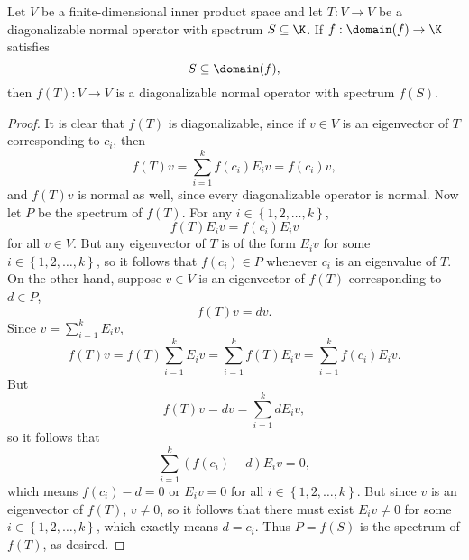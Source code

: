 \documentclass[linearalgebra]{subfiles}
\begin{document}
    \begin{prop}{}
        Let $V$ be a finite-dimensional inner product space and let $T:V\to V$ be a diagonalizable normal operator with spectrum $S\subseteq\K$. If $f:\domain(f)\to\K$ satisfies
        \begin{equation*}
            S\subseteq \domain(f),
        \end{equation*}
        then $f(T):V\to V$ is a diagonalizable normal operator with spectrum $f(S)$. 
    \end{prop}

    \begin{proof}
        It is clear that $f(T)$ is diagonalizable, since if $v\in V$ is an eigenvector of $T$ corresponding to $c_i$, then
        \begin{equation*}
            f(T)v = \sum^{k}_{i=1} f\left( c_i \right) E_iv = f\left( c_i \right) v,
        \end{equation*}
        and $f(T)v$ is normal as well, since every diagonalizable operator is normal. Now let $P$ be the spectrum of $f(T)$. For any $i\in\left\lbrace 1,2,\ldots,k \right\rbrace$, 
        \begin{equation*}
            f(T)E_iv = f\left( c_i \right) E_iv
        \end{equation*}
        for all $v\in V$. But any eigenvector of $T$ is of the form $E_iv$ for some $i\in\left\lbrace 1,2,\ldots,k \right\rbrace$, so it follows that $f\left( c_i \right)\in P$ whenever $c_i$ is an eigenvalue of $T$. On the other hand, suppose $v\in V$ is an eigenvector of $f(T)$ corresponding to $d\in P$,
        \begin{equation*}
            f(T)v = dv.
        \end{equation*}
        Since $v = \sum^{k}_{i=1} E_iv$,
        \begin{equation*}
            f(T)v = f(T) \sum^{k}_{i=1} E_iv = \sum^{k}_{i=1} f(T)E_iv = \sum^{k}_{i=1} f\left( c_i \right) E_iv.
        \end{equation*}
        But
        \begin{equation*}
            f(T)v = dv = \sum^{k}_{i=1} dE_iv,
        \end{equation*}
        so it follows that 
        \begin{equation*}
            \sum^{k}_{i=1} \left( f\left( c_i \right) -d \right) E_iv = 0,
        \end{equation*}
        which means $f\left( c_i \right) - d = 0$ or $E_iv = 0$ for all $i\in\left\lbrace 1,2,\ldots,k \right\rbrace$. But since $v$ is an eigenvector of $f(T)$, $v\neq 0$, so it follows that there must exist $E_iv\neq 0$ for some $i\in\left\lbrace 1,2,\ldots,k \right\rbrace$, which exactly means $d = c_i$. Thus $P = f(S)$ is the spectrum of $f(T)$, as desired. 
    \end{proof}
\end{document}
